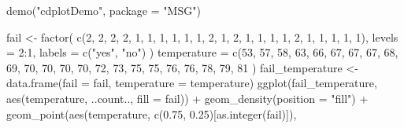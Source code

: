 \documentclass[
  b5paper,
  UTF8,twoside]{book}
\newenvironment{Shaded}{\begin{snugshade}}{\end{snugshade}}
\newcommand{\AttributeTok}[1]{\textcolor[rgb]{0.77,0.63,0.00}{#1}}
\newcommand{\DecValTok}[1]{\textcolor[rgb]{0.00,0.00,0.81}{#1}}
\newcommand{\FloatTok}[1]{\textcolor[rgb]{0.00,0.00,0.81}{#1}}
\newcommand{\FunctionTok}[1]{\textcolor[rgb]{0.00,0.00,0.00}{#1}}
\newcommand{\NormalTok}[1]{#1}
\newcommand{\OtherTok}[1]{\textcolor[rgb]{0.56,0.35,0.01}{#1}}
\newcommand{\SpecialCharTok}[1]{\textcolor[rgb]{0.00,0.00,0.00}{#1}}
\newcommand{\StringTok}[1]{\textcolor[rgb]{0.31,0.60,0.02}{#1}}
\begin{document}
\begin{Shaded}
\begin{Highlighting}[]
\FunctionTok{demo}\NormalTok{(}\StringTok{"cdplotDemo"}\NormalTok{, }\AttributeTok{package =} \StringTok{"MSG"}\NormalTok{)}

\NormalTok{fail }\OtherTok{\textless{}{-}}  \FunctionTok{factor}\NormalTok{(}
  \FunctionTok{c}\NormalTok{(}\DecValTok{2}\NormalTok{, }\DecValTok{2}\NormalTok{, }\DecValTok{2}\NormalTok{, }\DecValTok{2}\NormalTok{, }\DecValTok{1}\NormalTok{, }\DecValTok{1}\NormalTok{, }\DecValTok{1}\NormalTok{, }\DecValTok{1}\NormalTok{, }\DecValTok{1}\NormalTok{, }\DecValTok{1}\NormalTok{, }\DecValTok{2}\NormalTok{, }\DecValTok{1}\NormalTok{,}
    \DecValTok{2}\NormalTok{, }\DecValTok{1}\NormalTok{, }\DecValTok{1}\NormalTok{, }\DecValTok{1}\NormalTok{, }\DecValTok{1}\NormalTok{, }\DecValTok{2}\NormalTok{, }\DecValTok{1}\NormalTok{, }\DecValTok{1}\NormalTok{, }\DecValTok{1}\NormalTok{, }\DecValTok{1}\NormalTok{, }\DecValTok{1}\NormalTok{),}
  \AttributeTok{levels =} \DecValTok{2}\SpecialCharTok{:}\DecValTok{1}\NormalTok{, }
  \AttributeTok{labels =} \FunctionTok{c}\NormalTok{(}\StringTok{"yes"}\NormalTok{, }\StringTok{"no"}\NormalTok{)}
\NormalTok{)}
\NormalTok{temperature }\OtherTok{=} \FunctionTok{c}\NormalTok{(}\DecValTok{53}\NormalTok{, }\DecValTok{57}\NormalTok{, }\DecValTok{58}\NormalTok{, }\DecValTok{63}\NormalTok{, }\DecValTok{66}\NormalTok{, }\DecValTok{67}\NormalTok{, }\DecValTok{67}\NormalTok{, }\DecValTok{67}\NormalTok{, }\DecValTok{68}\NormalTok{, }\DecValTok{69}\NormalTok{, }\DecValTok{70}\NormalTok{,}
  \DecValTok{70}\NormalTok{, }\DecValTok{70}\NormalTok{, }\DecValTok{70}\NormalTok{, }\DecValTok{72}\NormalTok{, }\DecValTok{73}\NormalTok{, }\DecValTok{75}\NormalTok{, }\DecValTok{75}\NormalTok{, }\DecValTok{76}\NormalTok{, }\DecValTok{76}\NormalTok{, }\DecValTok{78}\NormalTok{, }\DecValTok{79}\NormalTok{, }\DecValTok{81}
\NormalTok{)}
\NormalTok{fail\_temperature }\OtherTok{\textless{}{-}} \FunctionTok{data.frame}\NormalTok{(}\AttributeTok{fail =}\NormalTok{ fail, }\AttributeTok{temperature =}\NormalTok{ temperature)}
\FunctionTok{ggplot}\NormalTok{(fail\_temperature, }\FunctionTok{aes}\NormalTok{(temperature, ..count.., }\AttributeTok{fill =}\NormalTok{ fail)) }\SpecialCharTok{+}
  \FunctionTok{geom\_density}\NormalTok{(}\AttributeTok{position =} \StringTok{"fill"}\NormalTok{) }\SpecialCharTok{+}
  \FunctionTok{geom\_point}\NormalTok{(}\FunctionTok{aes}\NormalTok{(temperature, }\FunctionTok{c}\NormalTok{(}\FloatTok{0.75}\NormalTok{, }\FloatTok{0.25}\NormalTok{)[}\FunctionTok{as.integer}\NormalTok{(fail)]),}

\end{Highlighting}
\end{Shaded}
\end{document}
